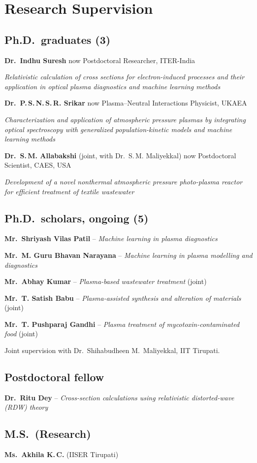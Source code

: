 \documentclass[11pt,a4paper]{article}
\newcommand{\sectionnb}[1]{\section*{#1}}   %
\newlength{\datew}\setlength{\datew}{2.75cm}
\newcommand{\dated}[2]{%
  \begin{list}{}{\setlength{\leftmargin}{\datew}\setlength{\labelwidth}{\datew}%
    \setlength{\labelsep}{0pt}\setlength{\topsep}{0pt}\setlength{\partopsep}{0pt}%
    \setlength{\itemsep}{0pt}\setlength{\parsep}{0pt}}
  \item[{\makebox[\datew][l]{\small\color{Muted}#1}}]#2
  \end{list}\vspace{3.5pt}}
\newcommand{\sub}[1]{\par{\small #1}}
\begin{document}
\sectionnb{Research Supervision}
\subsection*{Ph.D.\ graduates (3)}
\dated{2020 -- 2025}{\textbf{Dr.\ Indhu Suresh} \hfill{\small\color{Muted}now Postdoctoral Researcher, ITER-India}
  \sub{\emph{Relativistic calculation of cross sections for electron-induced processes and their application in optical plasma diagnostics and machine learning methods}}}
\dated{2019 -- 2025}{\textbf{Dr.\ P.\,S.\,N.\,S.\,R. Srikar} \hfill{\small\color{Muted}now Plasma--Neutral Interactions Physicist, UKAEA}
  \sub{\emph{Characterization and application of atmospheric pressure plasmas by integrating optical spectroscopy with generalized population-kinetic models and machine learning methods}}}
\dated{2019 -- 2024}{\textbf{Dr.\ S.\,M. Allabakshi} {\small(joint, with Dr.\ S.\,M. Maliyekkal)} \hfill{\small\color{Muted}now Postdoctoral Scientist, CAES, USA}
  \sub{\emph{Development of a novel nonthermal atmospheric pressure photo-plasma reactor for efficient treatment of textile wastewater}}}

\subsection*{Ph.D.\ scholars, ongoing (5)}
\dated{2024 -- present}{\textbf{Mr.\ Shriyash Vilas Patil} -- \emph{Machine learning in plasma diagnostics}}
\dated{2024 -- present}{\textbf{Mr.\ M. Guru Bhavan Narayana} -- \emph{Machine learning in plasma modelling and diagnostics}}
\dated{2024 -- present}{\textbf{Mr.\ Abhay Kumar} -- \emph{Plasma-based wastewater treatment} {\small(joint)}}
\dated{2022 -- present}{\textbf{Mr.\ T. Satish Babu} -- \emph{Plasma-assisted synthesis and alteration of materials} {\small(joint)}}
\dated{2022 -- present}{\textbf{Mr.\ T. Pushparaj Gandhi} -- \emph{Plasma treatment of mycotoxin-contaminated food} {\small(joint)}}
{\footnotesize\color{Muted}Joint supervision with Dr.\ Shihabudheen M.\ Maliyekkal, IIT Tirupati.}

\subsection*{Postdoctoral fellow}
\dated{}{\textbf{Dr.\ Ritu Dey} -- \emph{Cross-section calculations using relativistic distorted-wave (RDW) theory}}

\subsection*{M.S.\ (Research)}
\dated{}{\textbf{Ms.\ Akhila K.\,C.} (IISER Tirupati)}
\end{document}
